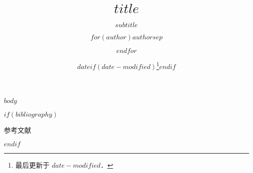 \documentclass[fontset=fandol]{ctexbeamer}
\title{$title$}
\subtitle{$subtitle$}
\author{$for(author)$$author$$sep$ \and $endfor$}
\institute{$for(institute)$$institute$$sep$ \and $endfor$}
\date{$date$$if(date-modified)$\thanks{最后更新于 $date-modified$．}$endif$}
\theoremstyle{theorem}
\theoremstyle{example}
\begin{document}
\frame{\titlepage}

$body$

$if(bibliography)$
\begin{frame}[allowframebreaks]{参考文献}
    \printbibliography[heading=none]
\end{frame}
$endif$
\end{document}
